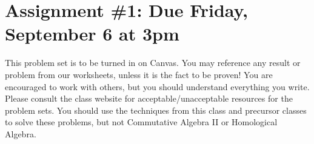 \documentclass[12pt]{amsart}
\newcommand{\showsol}[1]{\def\displaysol{#1}}
\begin{document}
\showsol{1}
	
	\thispagestyle{empty}
	
	\section*{Assignment \#1: Due Friday, September 6 at 3pm}
	
	This problem set is to be turned in on Canvas. You may reference any result or problem from our worksheets, unless it is the fact to be proven! You are encouraged to work with others, but you should understand everything you write. Please consult the class website for acceptable/unacceptable resources for the problem sets. You should use the techniques from this class and precursor classes to solve these problems, but not Commutative Algebra II or Homological Algebra. 
	
	\
	
	
	
\end{document}
